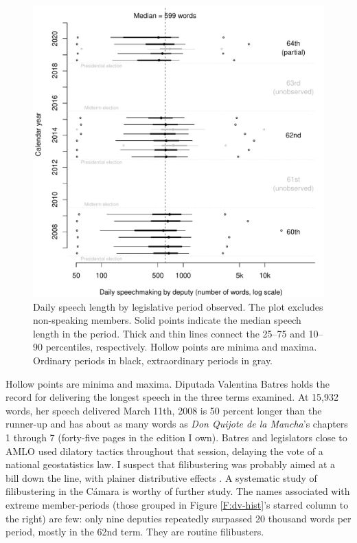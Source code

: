 \documentclass[letter,12pt]{article}
\begin{document}
\begin{figure}
  \centering
    \includegraphics[width=.5\columnwidth]{../plots/quantiles-periodo.pdf}
    \caption{Daily speech length by legislative period observed. The plot excludes non-speaking members. Solid points indicate the median speech length in the period. Thick and thin lines connect the 25--75 and 10--90 percentiles, respectively. Hollow points are minima and maxima. Ordinary periods in black, extraordinary periods in gray.}\label{F:quantiles}
\end{figure}

Hollow points are minima and maxima. Diputada Valentina Batres holds the record for delivering the longest speech in the three terms examined. At 15,932 words, her speech delivered March 11th, 2008 is 50 percent longer than the runner-up and has about as many words as \emph{Don Quijote de la Mancha}'s chapters 1 through 7 (forty-five pages in the edition I own). Batres and legislators close to AMLO used dilatory tactics throughout that session, delaying the vote of a national geostatistics law. I suspect that filibustering was probably aimed at a bill down the line, with plainer distributive effects \citep[cf.][]{wawro.schickler.filibuster.2007}. A systematic study of filibustering in the Cámara is worthy of further study. The names associated with extreme member-periods (those grouped in Figure \ref{F:dv-hist}'s starred column to the right) are few: only nine deputies repeatedly surpassed 20 thousand words per period, mostly in the 62nd term. They are routine filibusters.

\end{document}
